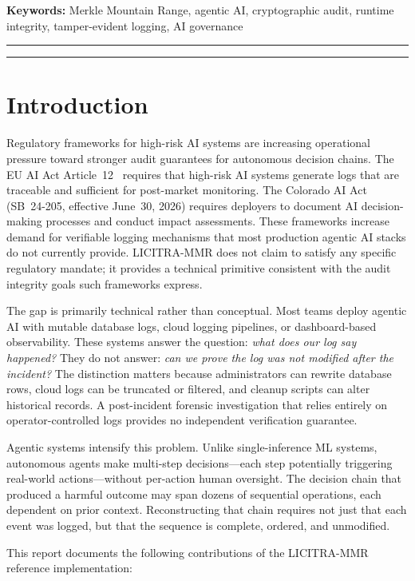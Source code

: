 \documentclass{article}
\begin{document}
\medskip
\noindent\textbf{Keywords:} Merkle Mountain Range, agentic AI, cryptographic
audit, runtime integrity, tamper-evident logging, AI governance

\bigskip\hrule\bigskip
\tableofcontents
\bigskip\hrule\bigskip

\section{Introduction}

Regulatory frameworks for high-risk AI systems are increasing operational
pressure toward stronger audit guarantees for autonomous decision chains.
The EU AI Act Article~12~\cite{euaiact} requires that high-risk AI systems
generate logs that are traceable and sufficient for post-market monitoring.
The Colorado AI Act~\cite{coloradoai} (SB~24-205, effective June~30, 2026)
requires deployers to document AI decision-making processes and conduct impact
assessments. These frameworks increase demand for verifiable logging mechanisms
that most production agentic AI stacks do not currently provide. LICITRA-MMR
does not claim to satisfy any specific regulatory mandate; it provides a
technical primitive consistent with the audit integrity goals such frameworks
express.

The gap is primarily technical rather than conceptual. Most teams deploy
agentic AI with mutable database logs, cloud logging pipelines, or
dashboard-based observability. These systems answer the question: \textit{what
does our log say happened?} They do not answer: \textit{can we prove the log
was not modified after the incident?} The distinction matters because
administrators can rewrite database rows, cloud logs can be truncated or
filtered, and cleanup scripts can alter historical records. A post-incident
forensic investigation that relies entirely on operator-controlled logs provides
no independent verification guarantee.

Agentic systems intensify this problem. Unlike single-inference ML systems,
autonomous agents make multi-step decisions---each step potentially triggering
real-world actions---without per-action human oversight. The decision chain
that produced a harmful outcome may span dozens of sequential operations, each
dependent on prior context. Reconstructing that chain requires not just that
each event was logged, but that the sequence is complete, ordered, and
unmodified.

This report documents the following contributions of the LICITRA-MMR reference
implementation:
\end{document}
